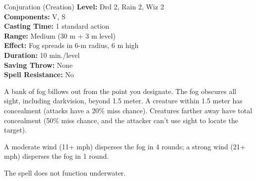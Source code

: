 {Conjuration (Creation)}
{
	\textbf{Level:}
	Drd 2, Rain 2, Wiz 2\\
	\textbf{Components:}
	V, S\\
	\textbf{Casting Time:}
	1 standard action\\
	\textbf{Range:}
	Medium (30 m + 3 m level)\\
	\textbf{Effect:}
	Fog spreads in 6-m radius, 6 m high\\
	\textbf{Duration:}
	10 min./level\\
	\textbf{Saving Throw:}
	None\\
	\textbf{Spell Resistance:}
	No\\
}
{
	A bank of fog billows out from the point you designate. The fog obscures all sight, including darkvision, beyond 1.5 meter. A creature within 1.5 meter has concealment (attacks have a 20\% miss chance). Creatures farther away have total concealment (50\% miss chance, and the attacker can't use sight to locate the target).

	A moderate wind (11+ mph) disperses the fog in 4 rounds; a strong wind (21+ mph) disperses the fog in 1 round.

	The spell does not function underwater.

}
